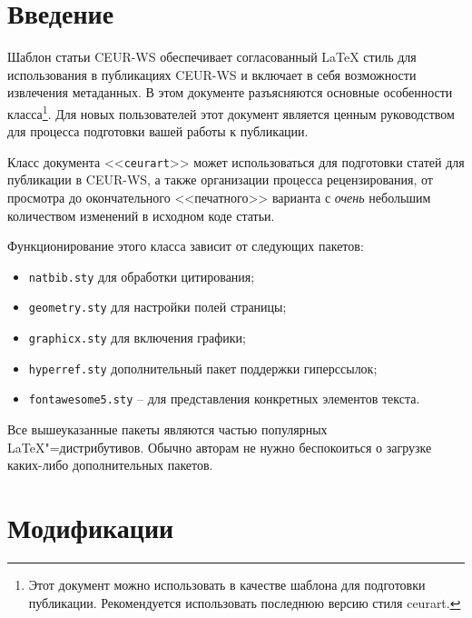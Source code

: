 \documentclass[
12pt,
babel,       %
firacode,    %
wordmath,      %
]{isdctart}
\begin{document}

\maketitle

\section{Введение}


Шаблон статьи CEUR-WS обеспечивает согласованный \LaTeX{} стиль для использования в публикациях CEUR-WS и включает в себя возможности извлечения метаданных. В этом документе разъясняются основные особенности класса\footnote{Этот документ можно использовать в качестве шаблона для подготовки публикации. Рекомендуется использовать последнюю версию стиля ceurart.}. Для новых пользователей этот документ является ценным руководством для процесса подготовки вашей работы к публикации.

Класс документа <<\verb|ceurart|>> может использоваться для подготовки статей для публикации в CEUR-WS, а также организации процесса рецензирования, от просмотра до окончательного <<печатного>> варианта с {\itshape очень} небольшим количеством изменений в исходном коде статьи.

Функционирование этого класса зависит от следующих пакетов:

\begin{itemize}
\item \verb|natbib.sty| для обработки цитирования;
\item \verb|geometry.sty| для настройки полей страницы;
\item \verb|graphicx.sty| для включения графики;
\item \verb|hyperref.sty| дополнительный пакет поддержки гиперссылок;
\item \verb|fontawesome5.sty| -- для представления конкретных элементов текста.
\end{itemize}

Все вышеуказанные пакеты являются частью популярных \LaTeX{}"=дистрибутивов. Обычно авторам не нужно беспокоиться о загрузке каких-либо дополнительных пакетов.

\section{Модификации}
\end{document}

